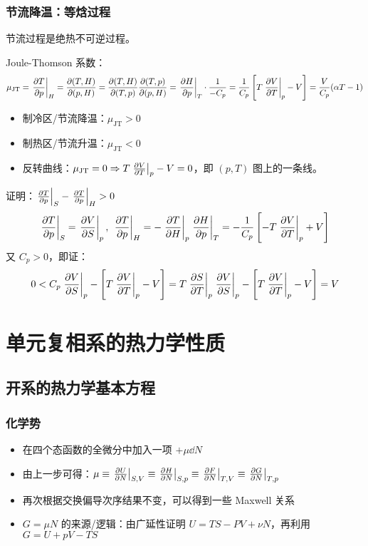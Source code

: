 \subsubsection{节流降温：等焓过程}

节流过程是绝热不可逆过程。

Joule-Thomson 系数：
\[
    \mu_{\text{JT}} = \left.\pdv{T}{p}\right|_H = \pdv{(T, H)}{(p, H)} = \pdv{(T, H)}{(T, p)} \pdv{(T, p)}{(p, H)} = \left.\pdv{H}{p}\right|_T \cdot \frac{1}{- C_p} = \frac{1}{C_p} \left[T \left.\pdv{V}{T}\right|_p - V\right] = \frac{V}{C_p} (\alpha T - 1)
\]

\begin{itemize}
    \item 制冷区/节流降温：$\mu_{\text{JT}} > 0$
    \item 制热区/节流升温：$\mu_{\text{JT}} < 0$
    \item 反转曲线：$\mu_{\text{JT}} = 0 \Rightarrow T \left.\pdv{V}{T}\right|_p - V = 0$，即 $(p, T)$ 图上的一条线。
\end{itemize}

\begin{framed}
    证明：$\left.\pdv{T}{p}\right|_S - \left.\pdv{T}{p}\right|_H > 0$
    \[
        \left.\pdv{T}{p}\right|_S = \left.\pdv{V}{S}\right|_p,\ \left.\pdv{T}{p}\right|_H = - \left.\pdv{T}{H}\right|_p \left.\pdv{H}{p}\right|_T = - \frac{1}{C_p} \left[- T \left.\pdv{V}{T}\right|_p + V\right]
    \]
    又 $C_p > 0$，即证：
    \[
        0 < C_p \left.\pdv{V}{S}\right|_p - \left[T \left.\pdv{V}{T}\right|_p - V\right] = T \left.\pdv{S}{T}\right|_p \left.\pdv{V}{S}\right|_p - \left[T \left.\pdv{V}{T}\right|_p - V\right] = V
    \]
\end{framed}

\section{单元复相系的热力学性质}

\subsection{开系的热力学基本方程}

\subsubsection{化学势}
\begin{itemize}
    \item 在四个态函数的全微分中加入一项 $+ \mu \dd{N}$
    \item 由上一步可得：$\mu \equiv \left.\pdv{U}{N}\right|_{S, V} \equiv \left.\pdv{H}{N}\right|_{S, p} \equiv \left.\pdv{F}{N}\right|_{T, V} \equiv \left.\pdv{G}{N}\right|_{T, p}$
    \item 再次根据交换偏导次序结果不变，可以得到一些 Maxwell 关系
    \item $G = \mu N$ 的来源/逻辑：由广延性证明 $U = T S - P V + \nu N$，再利用 $G = U + p V - T S$
\end{itemize}


